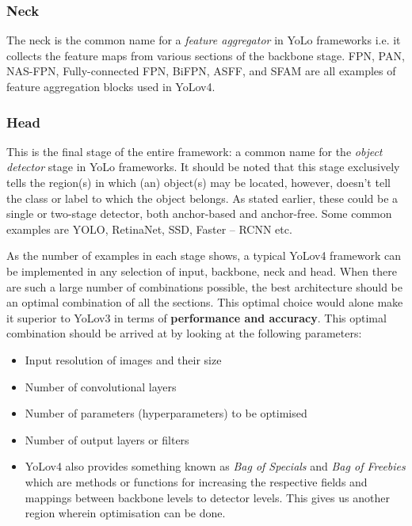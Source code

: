 \subsubsection{Neck}
The neck is the common name for a \textit{feature aggregator} in YoLo
frameworks i.e. it collects the feature maps from various sections of
the backbone stage. FPN, PAN, NAS-FPN, Fully-connected FPN, BiFPN,
ASFF, and SFAM are all examples of feature aggregation blocks used in YoLov4.

\subsubsection{Head}
This is the final stage of the entire framework: a common name for
the \textit{object detector} stage in YoLo frameworks. It should be
noted that this stage exclusively tells the region(s) in which (an)
object(s) may be located, however, doesn’t tell the class or label to
which the object belongs. As stated earlier, these could be a single
or two-stage detector, both anchor-based and anchor-free. Some common
examples are YOLO, RetinaNet, SSD, Faster – RCNN etc.

As the number of examples in each stage shows, a typical YoLov4
framework can be implemented in any selection of input, backbone,
neck and head. When there are such a large number of combinations
possible, the best architecture should be an optimal combination of
all the sections. This optimal choice would alone make it superior to
YoLov3 in terms of \textbf{performance and accuracy}. This optimal
combination should be arrived at by looking at the following parameters:

\begin{itemize}
  \item Input resolution of images and their size
  \item Number of convolutional layers
  \item Number of parameters (hyperparameters) to be optimised
  \item Number of output layers or filters
  \item YoLov4 also provides something known as \textit{Bag of
    Specials} and \textit{Bag of Freebies} which are methods or
    functions for increasing the respective fields and mappings
    between backbone levels to detector levels. This gives us another
    region wherein optimisation can be done.

\end{itemize}

